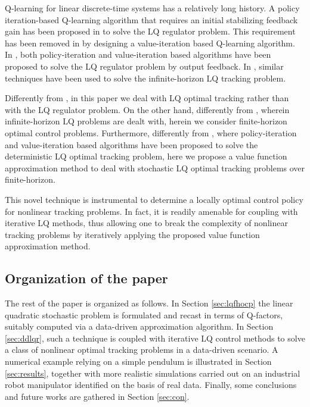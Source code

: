 \documentclass[10pt]{IEEEtran}      %
\theoremstyle{theorem}
\theoremstyle{remark}
\begin{document}
Q-learning for linear discrete-time systems has a relatively long history.
A policy iteration-based Q-learning algorithm that requires an initial stabilizing feedback gain 
has been proposed in \cite{bradtke1994adaptive} to solve the LQ regulator problem.
This requirement has been removed in \cite{landelius1997reinforcement} by designing a value-iteration
based Q-learning algorithm. In \cite{lewis2010reinforcement}, both policy-iteration and 
value-iteration based algorithms have been proposed to solve the LQ regulator
problem by output feedback.
In \cite{kiumarsi2015optimal,rizvi2018output}, similar techniques have been used to solve the infinite-horizon 
LQ tracking problem.

Differently from \cite{bradtke1994adaptive,landelius1997reinforcement}, in this paper we deal with LQ
optimal tracking rather than with the LQ regulator problem. On the other hand, differently from 
\cite{lewis2010reinforcement,rizvi2018output}, wherein infinite-horizon LQ 
problems are dealt with, herein we consider finite-horizon optimal control problems.
Furthermore, differently from \cite{kiumarsi2015optimal}, where policy-iteration and 
value-iteration based algorithms have been proposed to solve the deterministic LQ optimal tracking problem,
here we propose a value function approximation method to deal with stochastic LQ optimal tracking problems
over finite-horizon. 

This novel technique is instrumental to determine a locally optimal control policy for nonlinear tracking problems.
In fact, it is readily amenable for coupling with iterative LQ methods, thus allowing one to break the 
complexity of nonlinear tracking problems by iteratively applying the proposed value function approximation method.

\subsection{Organization of the paper}
The rest of the paper is organized as follows. In Section \ref{sec:lqfhocp} the linear quadratic stochastic problem is formulated and recast in terms of Q-factors, suitably computed via a data-driven approximation algorithm. In Section \ref{sec:ddlqr}, 
such a technique is coupled with iterative LQ control methods to solve a class of nonlinear optimal tracking problems in a 
data-driven scenario. A numerical example relying on a simple pendulum is illustrated in Section \ref{sec:results}, together with more realistic simulations carried out on an industrial robot manipulator identified on the basis of real data. Finally, some conclusions and future works are gathered in Section \ref{sec:con}.
\end{document}
